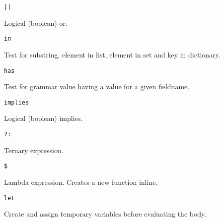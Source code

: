 {\begin{itemize}
{		\item[] \texttt{||}
		
			Logical (boolean) or.
			
		\item[] \texttt{in}
			
			Test for substring, element in list, element in set and key in
			dictionary.
			
		\item[] \texttt{has}
		
			Test for grammar value having a value for a given fieldname.
			
		\item[] \texttt{implies}
		
			Logical (boolean) implies.
			
		\item[] \texttt{?:}
		
			Ternary expression.
			
		\item[] \texttt{\$}
		
			Lambda expression. Creates a new function inline.
			
		\item[] \texttt{let}
		
			Create and assign temporary variables before evaluating the body.
	}
	\end{itemize}
}















